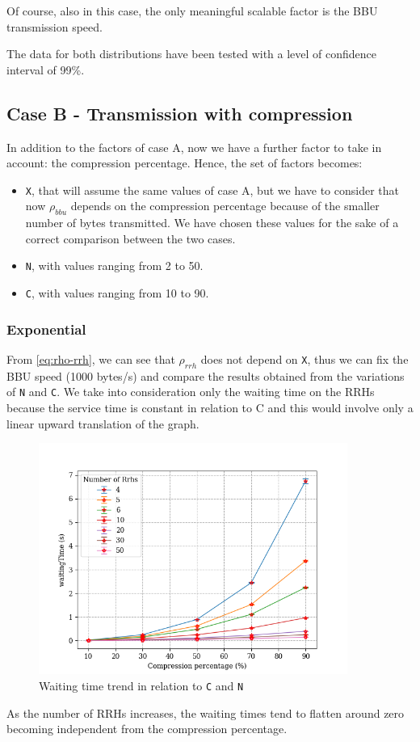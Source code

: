 \documentclass[11pt,a4paper,oneside, openright]{article}
\begin{document}
Of course, also in this case, the only meaningful scalable factor is the BBU transmission speed.

The data for both distributions have been tested with a level of confidence interval of 99\%. 

\subsection{Case B - Transmission with compression}
In addition to the factors of case A, now we have a further factor to take in account: the compression percentage. Hence, the set of factors becomes:

\begin{itemize}
	\item \texttt{X}, that will assume the same values of case A, but we have to consider that now $ \rho_{bbu} $ depends on the compression percentage because of the smaller number of bytes transmitted. We have chosen these values for the sake of a correct comparison between the two cases.
	\item \texttt{N}, with values ranging from 2 to 50.
	\item \texttt{C}, with values ranging from 10 to 90.
\end{itemize}

\subsubsection{Exponential}
From \eqref{eq:rho-rrh}, we can see that $ \rho_{rrh} $ does not depend on \texttt{X}, thus we can fix the BBU speed (1000 bytes/s) and compare the results obtained from the variations of \texttt{N} and \texttt{C}. We take into consideration only the waiting time on the RRHs because the service time is constant in relation to C and this would involve only a linear upward translation of the graph.


\begin{figure}[h]
	\centering
	\includegraphics[width=0.9\textwidth]{images/c-vs-waiting}
	\caption{Waiting time trend in relation to \texttt{C} and \texttt{N}}
	\label{fig:c-vs-waiting}
\end{figure}

As the number of RRHs increases, the waiting times tend to flatten around zero becoming independent from the compression percentage.
\end{document}
